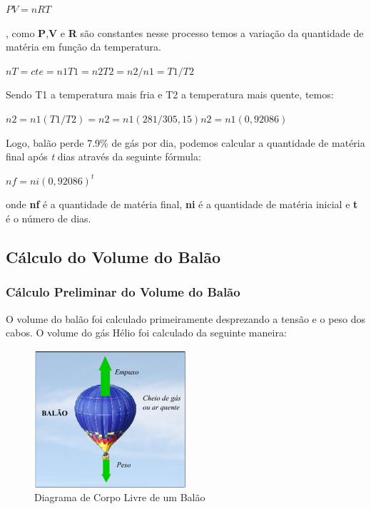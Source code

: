 			$PV = nRT$

		, como \textbf{P},\textbf{V} e \textbf{R} são constantes nesse processo temos a variação da quantidade de matéria em função da temperatura.

		$nT = cte  = n1T1 = n2T2  = n2/n1 = T1/T2$

		Sendo T1 a temperatura mais fria e T2 a temperatura mais quente, temos:

			$n2 = n1(T1/T2) = n2 = n1 (281/305,15) n2 = n1 (0,92086)$

		Logo, balão perde 7.9\% de gás por dia, podemos calcular a quantidade de matéria final após \textit{t} dias através da seguinte fórmula:

			$nf = ni (0,92086)^t$

 		onde \textbf{nf} é a quantidade de matéria final, \textbf{ni} é a quantidade de matéria inicial e \textbf{t} é o número de dias.


\subsection{Cálculo  do Volume do Balão} %
\label{sub:c_lculo_do_volume_do_bal_o}

	\subsubsection{Cálculo Preliminar do Volume do Balão}

	O volume do balão foi calculado primeiramente desprezando a tensão e o peso dos cabos. 	O volume do gás Hélio foi calculado da seguinte maneira:

	\begin{figure}[H]
		\centering
		\includegraphics[width=0.5\textwidth]{figuras/corpoLivreBalao}
		\caption[Diagrama de Corpo Livre de um Balão]{Diagrama de Corpo Livre de um Balão~\cite{justino}}
		\label{img:corpoLivreBalao}
	\end{figure}


